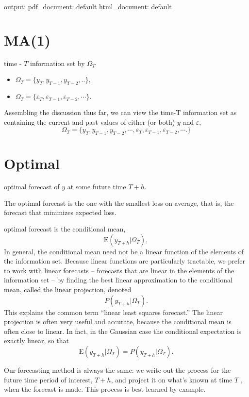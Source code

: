 \documentclass[]{article}
\title{}
\author{}
\date{}
\providecommand{\tightlist}{%
  \setlength{\itemsep}{0pt}\setlength{\parskip}{0pt}}
\begin{document}
output: pdf\_document: default html\_document: default

\hypertarget{ma1}{%
\section{MA(1)}\label{ma1}}

time - \(T\) information set by \(\Omega_T\)

\begin{itemize}
\tightlist
\item
  \(\Omega_T = \{y_T , y_{T −1} , y_{T −2} , ..\},\)
\item
  \(\Omega _T = \{\varepsilon_T , \varepsilon_{T −1} , \varepsilon_{T −2} , \cdots\}.\)
\end{itemize}

Assembling the discussion thus far, we can view the time-T information
set as containing the current and past values of either (or both) \(y\)
and \(\varepsilon,\)
\[\Omega_T =\{ y_{T} , y_{T −1} , y_{T −2}, \cdots, \varepsilon _{T } , \varepsilon_{T −1} , \varepsilon _{T −2} , \cdots.\}\]

\hypertarget{optimal}{%
\section{Optimal}\label{optimal}}

optimal forecast of \(y\) at some future time \(T + h\).

The optimal forecast is the one with the smallest loss on average, that
is, the forecast that minimizes expected loss.

optimal forecast is the conditional mean,
\[\mathrm{E}(y_{T +h} |\Omega_T ),\] In general, the conditional mean
need not be a linear function of the elements of the information set.
Because linear functions are particularly tractable, we prefer to work
with linear forecasts -- forecasts that are linear in the elements of
the information set -- by finding the best linear approximation to the
conditional mean, called the linear projection, denoted
\[P(y_{T +h} |\Omega_T ).\] This explains the common term ``linear least
squares forecast.'' The linear projection is often very useful and
accurate, because the conditional mean is often close to linear. In
fact, in the Gaussian case the conditional expectation is exactly
linear, so that
\[\mathrm{E}(y_{T +h} |\Omega_T ) = P (y_{T +h} |\Omega_T ).\]

Our forecasting method is always the same: we write out the process for
the future time period of interest, \(T + h\), and project it on what's
known at time \(T\) , when the forecast is made. This process is best
learned by example.
\end{document}
